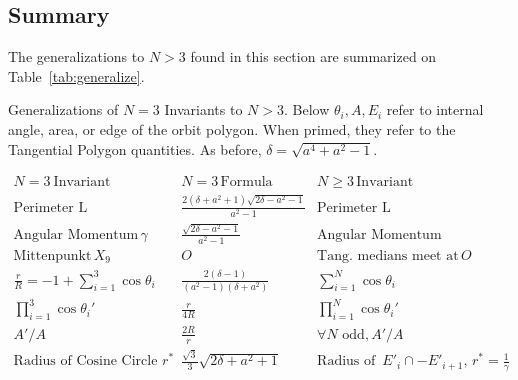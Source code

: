 \subsection{Summary}

The generalizations to $N>3$ found in this section are summarized on Table~\ref{tab:generalize}.

\begin{table}[H]
\caption{Generalizations of $N=3$ Invariants to $N>3$. Below $\theta_i,A,E_i$ refer to internal angle, area, or edge of the orbit polygon. When primed, they refer to the Tangential Polygon quantities. As before, $\delta=\sqrt{a^4+a^2-1}$.}
\label{tab:generalize}
$$
\begin{array}{r|c|c}
N=3~\mbox{Invariant} & N=3\,\mbox{Formula} & N\geq3\,\mbox{Invariant}  \\
\hline
\mbox{Perimeter L}&\frac{2(\delta+a^2+1)\sqrt{2\delta-a^2-1}}{a^2-1}&\mbox{Perimeter L}\\
\mbox{Angular Momentum}\,\gamma&\frac{\sqrt{2\delta-a^2-1}}{a^2-1}&\mbox{Angular Momentum}\\
\mbox{Mittenpunkt}\,X_9 & O & \mbox{Tang. medians meet at}\,O \\[5pt]
\frac{r}{R}=-1+\sum_{i=1}^3{\cos\theta_i} & \frac{2(\delta-1)}{(a^2-1)(\delta+a^2)} & \sum_{i=1}^N{\cos\theta_i} \\[5pt]
\prod_{i=1}^{3}{\cos\theta_i'} & \frac{r}{4R} & \prod_{i=1}^N{\cos\theta_i'} \\[5pt]
A'/A & \frac{2R}{r} & \forall{N}\mbox{ odd},A'/A\\[5pt]
\mbox{Radius of Cosine Circle }r^* &
    \frac{\sqrt{3}}{3}\sqrt{2\delta+a^2+1} & \mbox{Radius of }\,E'_i\cap-E'_{i+1},\,r^*=\frac{1}{\gamma}
\end{array}
$$
\end{table}